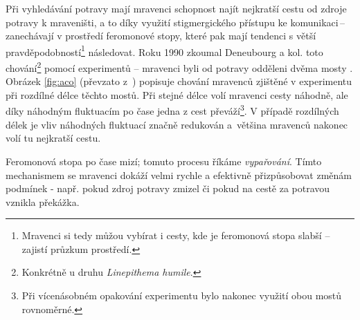 \documentclass[a4paper,12pt]{article}
\begin{document}

Při vyhledávání potravy mají mravenci schopnost najít nejkratší cestu od zdroje potravy k mraveništi,
a to díky využití stigmergického přístupu ke komunikaci\,--\,zanechávají v prostředí
feromonové stopy, které pak mají tendenci s větší pravděpodobností\footnote{Mravenci si tedy můžou vybírat i
cesty, kde je feromonová stopa slabší -- zajistí průzkum prostředí.} následovat. Roku 1990 zkoumal
Deneubourg a kol. toto
chování\footnote{Konkrétně u druhu {\it Linepithema humile}.} pomocí experimentů -- mravenci byli od potravy
odděleni dvěma mosty \cite{Dorigo06antcolony}. Obrázek \ref{fig:aco} (převzato z~\cite{Blum08SwarmOpt})
popisuje chování mravenců zjištěné v experimentu při rozdílné
délce těchto mostů. Při stejné délce volí mravenci cesty náhodně, ale díky náhodným fluktuacím po čase
jedna z cest převáží\footnote{Při vícenásobném opakování experimentu bylo nakonec využití obou mostů rovnoměrné.}.
V případě rozdílných délek je vliv náhodných fluktuací značně redukován a~většina mravenců nakonec volí
tu nejkratší cestu.

Feromonová stopa po čase mizí; tomuto procesu říkáme {\it vypařování}. Tímto mechanismem se
mravenci dokáží velmi rychle a efektivně přizpůsobovat změnám podmínek - např. pokud zdroj
potravy zmizel či pokud na cestě za potravou vznikla překážka.
\end{document}
